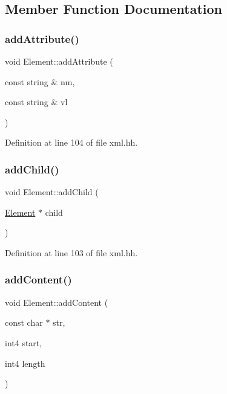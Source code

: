 \subsection{Member Function Documentation}
\mbox{\label{class_element_a49f5e63e04bfc793832db7091553abf2}} 
\subsubsection{\texorpdfstring{addAttribute()}{addAttribute()}}
{\footnotesize\ttfamily void Element\+::add\+Attribute (\begin{DoxyParamCaption}\item[{const string \&}]{nm,  }\item[{const string \&}]{vl }\end{DoxyParamCaption})\hspace{0.3cm}{\ttfamily [inline]}}



Definition at line 104 of file xml.\+hh.

\mbox{\label{class_element_a5e5de37f6b79a3a952d021ba15b3912d}} 
\subsubsection{\texorpdfstring{addChild()}{addChild()}}
{\footnotesize\ttfamily void Element\+::add\+Child (\begin{DoxyParamCaption}\item[{\mbox{\hyperlink{class_element}{Element}} $\ast$}]{child }\end{DoxyParamCaption})\hspace{0.3cm}{\ttfamily [inline]}}



Definition at line 103 of file xml.\+hh.

\mbox{\label{class_element_aaad8f8e819869b0906c10c3e2829ec12}} 
\subsubsection{\texorpdfstring{addContent()}{addContent()}}
{\footnotesize\ttfamily void Element\+::add\+Content (\begin{DoxyParamCaption}\item[{const char $\ast$}]{str,  }\item[{int4}]{start,  }\item[{int4}]{length }\end{DoxyParamCaption})\hspace{0.3cm}{\ttfamily [inline]}}



